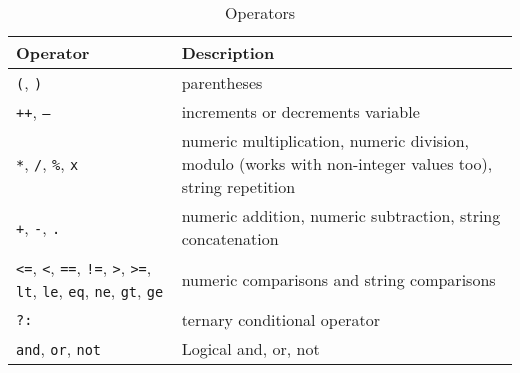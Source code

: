 \begin{table}[htb]
\begin{tabular}{|l|p{7cm}|}
\hline
Operator & Description \\
\hline
\hline

\texttt{(}, \texttt{)} & parentheses \\

\hline

\texttt{++}, \texttt{--} &
increments or decrements variable \\

\hline

\texttt{*}, \texttt{/}, \texttt{\%}, \texttt{x} &
numeric multiplication, numeric division, modulo (works
with non-integer values too), string repetition \\

\hline

\texttt{+}, \texttt{-}, \texttt{.} & numeric addition,
numeric subtraction, string concatenation \\

\hline

\texttt{<=}, \texttt{<}, \texttt{==},
\texttt{!=}, \texttt{>}, \texttt{>=},
\texttt{lt}, \texttt{le}, \texttt{eq},
\texttt{ne}, \texttt{gt}, \texttt{ge} &
numeric comparisons and string comparisons \\

\hline

\texttt{?:} & ternary conditional operator \\

\hline

\texttt{and},
\texttt{or},
\texttt{not} &
Logical and, or, not \\

\hline

\end{tabular}
\caption{Operators}
\label{operators}
\end{table}


